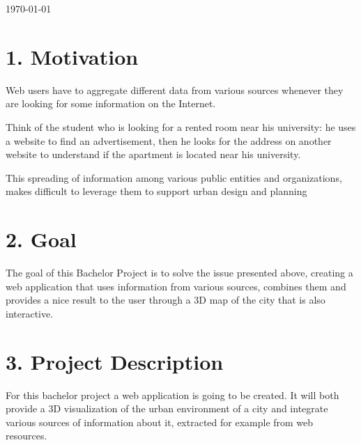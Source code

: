 \documentclass[a4paper]{article}
\begin{document}
\begin{titlepage}

{\large \today}\\[3cm] %



 

\vfill %

\end{titlepage}

\section*{1. Motivation}
Web users have to aggregate different data from various sources whenever they are looking for some information on the Internet.

Think of the student who is looking for a rented room near his university: he uses a website to find an advertisement, then he looks for the address on another website to understand if the apartment is located near his university.


This spreading of information among various public entities and organizations, makes difficult to leverage them to support urban design and planning

\section*{2. Goal}
The goal of this Bachelor Project is to solve the issue presented above, creating a web application that uses information from various sources, combines them and provides a nice result to the user through a 3D map of the city that is also interactive.\\


\section*{3. Project Description}
For this bachelor project a web application is going to be created. It will both provide a 3D visualization of the urban environment of a city and integrate various sources of information about it, extracted for example from web resources.
\end{document}
